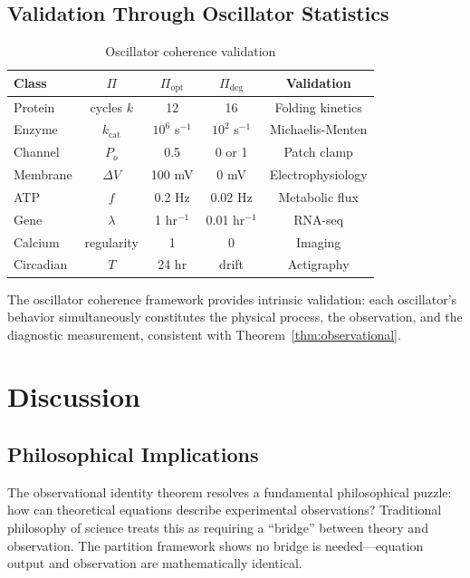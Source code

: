 \documentclass[aps,prd,twocolumn,superscriptaddress,floatfix,nofootinbib]{revtex4-2}
\theoremstyle{remark}
\begin{document}
\subsection{Validation Through Oscillator Statistics}

\begin{table}[h]
\centering
\caption{Oscillator coherence validation}
\label{tab:oscillator_validation}
\begin{tabular}{@{}lcccc@{}}
\toprule
Class & $\Pi$ & $\Pi_{\mathrm{opt}}$ & $\Pi_{\mathrm{deg}}$ & Validation \\
\midrule
Protein & cycles $k$ & 12 & 16 & Folding kinetics \\
Enzyme & $k_{\mathrm{cat}}$ & $10^6$ s$^{-1}$ & $10^2$ s$^{-1}$ & Michaelis-Menten \\
Channel & $P_o$ & 0.5 & 0 or 1 & Patch clamp \\
Membrane & $\Delta V$ & 100 mV & 0 mV & Electrophysiology \\
ATP & $f$ & 0.2 Hz & 0.02 Hz & Metabolic flux \\
Gene & $\lambda$ & 1 hr$^{-1}$ & 0.01 hr$^{-1}$ & RNA-seq \\
Calcium & regularity & 1 & 0 & Imaging \\
Circadian & $T$ & 24 hr & drift & Actigraphy \\
\bottomrule
\end{tabular}
\end{table}

The oscillator coherence framework provides intrinsic validation: each oscillator's behavior simultaneously constitutes the physical process, the observation, and the diagnostic measurement, consistent with Theorem~\ref{thm:observational}.

\section{Discussion}
\label{sec:discussion}

\subsection{Philosophical Implications}

The observational identity theorem resolves a fundamental philosophical puzzle: how can theoretical equations describe experimental observations? Traditional philosophy of science treats this as requiring a ``bridge'' between theory and observation. The partition framework shows no bridge is needed---equation output and observation are mathematically identical.
\end{document}
